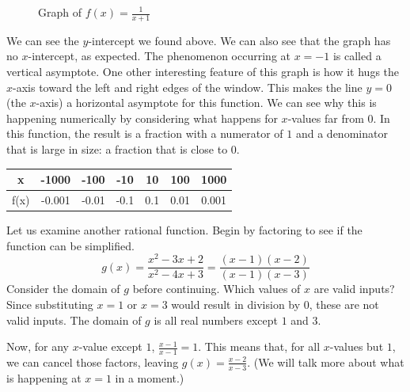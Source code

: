\begin{figure}[H]
  \centering
  \caption{Graph of \( f(x) = \frac{1}{x+1} \)}
\end{figure}

We can see the \( y \)-intercept we found above. We can also see that the graph has no \( x \)-intercept, as expected. The phenomenon occurring at \( x = -1 \) is called a vertical asymptote. One other interesting feature of this graph is how it hugs the \( x \)-axis toward the left and right edges of the window. This makes the line \( y = 0 \) (the \( x \)-axis) a horizontal asymptote for this function. We can see why this is happening numerically by considering what happens for \( x \)-values far from \( 0 \). In this function, the result is a fraction with a numerator of \( 1 \) and a denominator that is large in size: a fraction that is close to \( 0 \).

\begin{center}
\begin{tabular}{ |c|c|c|c|c|c|c| } 
 \hline
 x & -1000 & -100 & -10 & 10 & 100 & 1000 \\ 
 \hline
 f(x) & -0.001 & -0.01 & -0.1 & 0.1 & 0.01 & 0.001 \\ 
 \hline
\end{tabular}
\end{center}

Let us examine another rational function. Begin by factoring to see if the function can be simplified.
\[ g(x) = \frac{x^2 - 3x + 2}{x^2 - 4x + 3} = \frac{(x - 1)(x - 2)}{(x - 1)(x - 3)} \]
Consider the domain of \( g \) before continuing. Which values of \( x \) are valid inputs? Since substituting \( x = 1 \) or \( x = 3 \) would result in division by \( 0 \), these are not valid inputs. The domain of \( g \) is all real numbers except \( 1 \) and \( 3 \).

Now, for any \( x \)-value except \( 1 \), \( \frac{x-1}{x-1} = 1 \). This means that, for all \( x \)-values but \(1\), we can cancel those factors, leaving \( g(x) = \frac{x-2}{x-3} \). (We will talk more about what is happening at \( x = 1 \) in a moment.)

